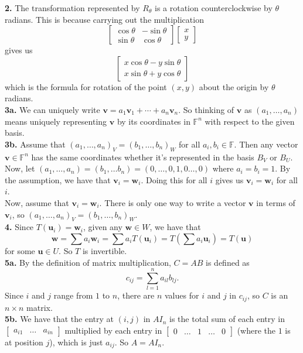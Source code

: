 \documentclass{article}
\newcommand{\bv}{\mathbf{v}}
\newcommand{\bu}{\mathbf{u}}
\newcommand{\bw}{\mathbf{w}}
\newcommand{\F}{\mathbb{F}}
\begin{document}
\textbf{2.} The transformation represented by $R_\theta$ is a rotation counterclockwise by $\theta$ radians. This is because carrying out the multiplication
$$\begin{bmatrix}
    \cos\theta & -\sin\theta \\
    \sin\theta & \cos\theta
\end{bmatrix}
\begin{bmatrix}
    x \\
    y
\end{bmatrix}$$
gives us
$$\begin{bmatrix}
    x\cos\theta - y\sin\theta \\
    x\sin\theta + y\cos\theta
\end{bmatrix}$$
which is the formula for rotation of the point $(x, y)$ about the origin by $\theta$ radians. \\

\textbf{3a.} We can uniquely write $\bv = a_1\bv_1 + \cdots + a_n\bv_n$. So thinking of $\bv$ as $(a_1, \ldots, a_n)$ means uniquely representing $\bv$ by its coordinates in $\F^n$ with respect to the given basis. \\

\textbf{3b.} Assume that $(a_1, \ldots, a_n)_V = (b_1, \ldots, b_n)_W$ for all $a_i, b_i \in \F$. Then any vector $\bv \in \F^n$ has the same coordinates whether it's represented in the basis $B_V$ or $B_U$. Now, let $(a_1, \ldots, a_n) = (b_1, \ldots b_n) = (0, \ldots, 0, 1, 0 \ldots, 0)$ where $a_i = b_i = 1$. By the assumption, we have that $\bv_i = \bw_i$. Doing this for all $i$ gives us $\bv_i = \bw_i$ for all $i$. \\

Now, assume that $\bv_i = \bw_i$. There is only one way to write a vector $\bv$ in terms of $\bv_i$, so $(a_1, \ldots, a_n)_V = (b_1, \ldots, b_n)_W$. \\

\textbf{4.} Since $T(\bu_i) = \bw_i$, given any $\bw \in W$, we have that
$$\bw = \sum a_i\bw_i = \sum a_iT(\bu_i) = T\left(\sum a_i\bu_i\right) = T(\bu)$$
for some $\bu \in U$. So $T$ is invertible. \\

\textbf{5a.} By the definition of matrix multiplication, $C = AB$ is defined as
$$c_{ij} = \sum_{l = 1}^n a_{il}b_{lj}.$$
Since $i$ and $j$ range from $1$ to $n$, there are $n$ values for $i$ and $j$ in $c_{ij}$, so $C$ is an $n\times n$ matrix. \\

\textbf{5b.} We have that the entry at $(i, j)$ in $AI_n$ is the total sum of each entry in
$\begin{bmatrix}
    a_{i1} & \ldots & a_{in}
\end{bmatrix}$
multiplied by each entry in
$\begin{bmatrix}
    0 & \ldots & 1 & \ldots & 0
\end{bmatrix}$ (where the $1$ is at position $j$), which is just $a_{ij}$. So $A = AI_n$. \\
\end{document}
